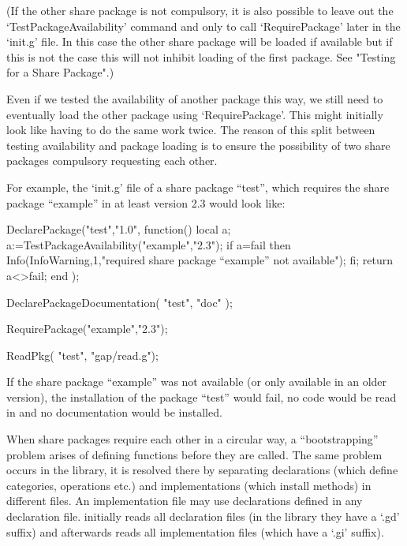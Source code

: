 (If the other share package is not compulsory, it is also possible to leave
out the `TestPackageAvailability' command and only to call `RequirePackage'
later in the `init.g' file. In this case the other share package will be
loaded if available but if this is not the case this will not inhibit
loading of the first package. See "Testing for a Share Package".)

Even if we tested the availability of another package this way, we
still  need to eventually load the other package using
`RequirePackage'. This might initially look like having to do the same
work twice. The reason of this split between testing availability and
package loading is to ensure the possibility of two share packages
compulsory requesting each other.

For example, the `init.g' file of a share package ``test'', which requires
the share package ``example'' in at least version 2.3 would look like:

\begintt
DeclarePackage("test","1.0",
  function()
  local a;
    a:=TestPackageAvailability("example","2.3");
    if a=fail then
      Info(InfoWarning,1,"required share package ``example'' not available");
    fi;
    return a<>fail;
  end
  );

DeclarePackageDocumentation( "test", "doc" );

RequirePackage("example","2.3");

ReadPkg( "test", "gap/read.g");
\endtt

If the share package ``example'' was not available (or only available in an
older version), the installation of the package ``test'' would fail, no code
would be read in and no documentation would be installed.


When  share   packages  require  each other    in  a  circular  way, a
``bootstrapping'' problem arises of defining functions before they are
called. The same  problem occurs in the  library, it is resolved there
by separating declarations (which  define categories, operations etc.)
and   implementations (which install methods)   in different files. An
implementation  file may use   declarations defined in any declaration
file.   {\GAP} initially reads all  declaration  files (in the library
they have a `.gd' suffix) and afterwards reads all implementation files
(which have a `.gi' suffix).

